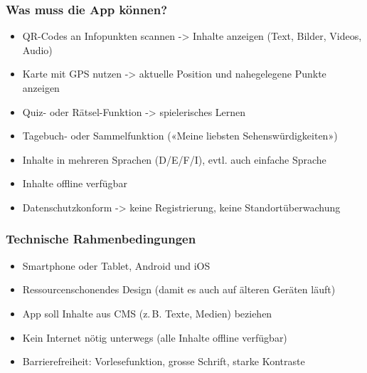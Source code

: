 \documentclass[10pt]{article}
\begin{document}
	\subsubsection[Was]{Was muss die App können?}
	\begin{itemize}
		\item QR-Codes an Infopunkten scannen -> Inhalte anzeigen (Text, Bilder, Videos, Audio)
		\item Karte mit GPS nutzen -> aktuelle Position und nahegelegene Punkte anzeigen
		\item Quiz- oder Rätsel-Funktion -> spielerisches Lernen
		\item Tagebuch- oder Sammelfunktion («Meine liebsten Sehenswürdigkeiten»)
		\item Inhalte in mehreren Sprachen (D/E/F/I), evtl. auch einfache Sprache
		\item Inhalte offline verfügbar
		\item Datenschutzkonform -> keine Registrierung, keine Standortüberwachung
	\end{itemize}
	\subsubsection[Womit]{Technische Rahmenbedingungen}
	\begin{itemize}
		\item Smartphone oder Tablet, Android und iOS
		\item Ressourcenschonendes Design (damit es auch auf älteren Geräten läuft)
		\item App soll Inhalte aus CMS (z.\,B. Texte, Medien) beziehen
		\item Kein Internet nötig unterwegs (alle Inhalte offline verfügbar)
		\item Barrierefreiheit: Vorlesefunktion, grosse Schrift, starke Kontraste
	\end{itemize}
\end{document}
